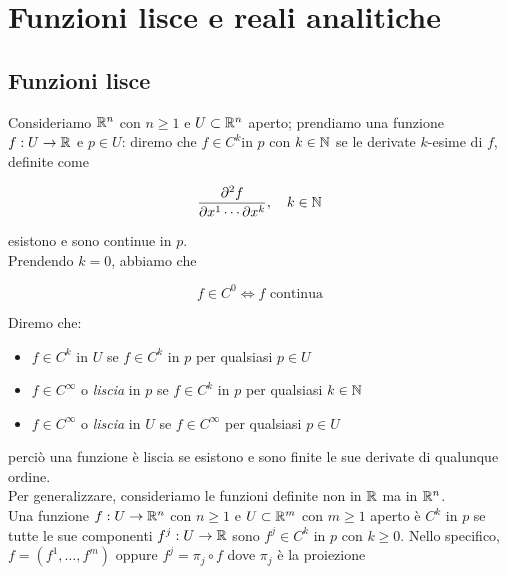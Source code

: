 \section{Funzioni lisce e reali analitiche}

\subsection{Funzioni lisce}

Consideriamo $ \mathbb{R}^{n} $ con $ n \geq 1 $ e $ U \subset \mathbb{R}^{n} $ aperto; prendiamo una funzione $ f : U \to \mathbb{R} $ e $ p \in U $: diremo che $ f \in C^{k} $in $ p $ con $ k \in \mathbb{N} $ se le derivate $ k $-esime di $ f $, definite come

\begin{equation}
	\pdv[k]{f}{x^{1} \cdots}{x^{k}} \qcomma k \in \N
\end{equation}

esistono e sono continue in $ p $. \\
Prendendo $ k = 0 $, abbiamo che

\begin{equation}
	f \in C^{0} \iff f \text{ continua}
\end{equation}

Diremo che:

\begin{itemize}
	\item $ f \in C^{k} $ in $ U $ se $ f \in C^{k} $ in $ p $ per qualsiasi $ p \in U $
	
	\item $ f \in C^{\infty} $ o \textit{liscia} in $ p $ se $ f \in C^{k} $ in $ p $ per qualsiasi $ k \in \mathbb{N} $
	
	\item $ f \in C^{\infty} $ o \textit{liscia} in $ U $ se $ f \in C^{\infty} $ per qualsiasi $ p \in U $
\end{itemize}

perciò una funzione è liscia se esistono e sono finite le sue derivate di qualunque ordine. \\
Per generalizzare, consideriamo le funzioni definite non in $ \mathbb{R} $ ma in $ \mathbb{R}^{n} $. \\
Una funzione $ f : U \to \mathbb{R}^{n} $ con $ n \geq 1 $ e $ U \subset \mathbb{R}^{m} $ con $ m \geq 1 $ aperto è $ C^{k} $ in $ p $ se tutte le sue componenti $ f^{j} : U \to \mathbb{R} $ sono $ f^{j} \in C^{k} $ in $ p $ con $ k \geq 0 $. Nello specifico, $ f = (f^{1}, \dots, f^{m}) $ oppure $ f^{j} = \pi_{j} \circ f $ dove $ \pi_{j} $ è la proiezione

